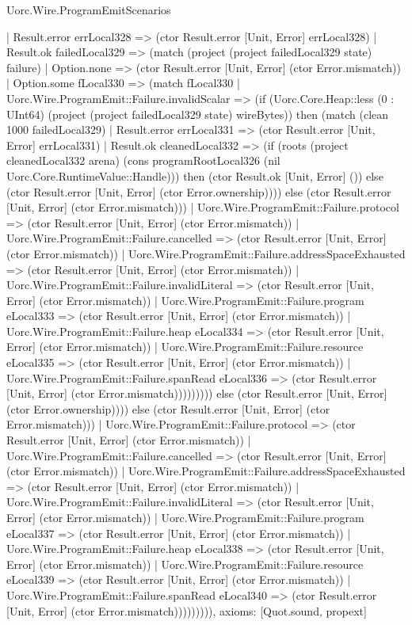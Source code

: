 \begin{lexlean}{Uorc.Wire.ProgramEmitScenarios}
\begin{semanticmodule}
{                | Result.error errLocal328 => (ctor Result.error [Unit, Error] errLocal328)
                | Result.ok failedLocal329 => (match (project (project failedLocal329 state) failure)
                  | Option.none => (ctor Result.error [Unit, Error] (ctor Error.mismatch))
                  | Option.some fLocal330 => (match fLocal330
                    | Uorc.Wire.ProgramEmit::Failure.invalidScalar => (if (Uorc.Core.Heap::less (0 : UInt64) (project (project failedLocal329 state) wireBytes)) then (match (clean 1000 failedLocal329)
                      | Result.error errLocal331 => (ctor Result.error [Unit, Error] errLocal331)
                      | Result.ok cleanedLocal332 => (if (roots (project cleanedLocal332 arena) (cons programRootLocal326 (nil Uorc.Core.RuntimeValue::Handle))) then (ctor Result.ok [Unit, Error] ()) else (ctor Result.error [Unit, Error] (ctor Error.ownership)))) else (ctor Result.error [Unit, Error] (ctor Error.mismatch)))
                    | Uorc.Wire.ProgramEmit::Failure.protocol => (ctor Result.error [Unit, Error] (ctor Error.mismatch))
                    | Uorc.Wire.ProgramEmit::Failure.cancelled => (ctor Result.error [Unit, Error] (ctor Error.mismatch))
                    | Uorc.Wire.ProgramEmit::Failure.addressSpaceExhausted => (ctor Result.error [Unit, Error] (ctor Error.mismatch))
                    | Uorc.Wire.ProgramEmit::Failure.invalidLiteral => (ctor Result.error [Unit, Error] (ctor Error.mismatch))
                    | Uorc.Wire.ProgramEmit::Failure.program eLocal333 => (ctor Result.error [Unit, Error] (ctor Error.mismatch))
                    | Uorc.Wire.ProgramEmit::Failure.heap eLocal334 => (ctor Result.error [Unit, Error] (ctor Error.mismatch))
                    | Uorc.Wire.ProgramEmit::Failure.resource eLocal335 => (ctor Result.error [Unit, Error] (ctor Error.mismatch))
                    | Uorc.Wire.ProgramEmit::Failure.spanRead eLocal336 => (ctor Result.error [Unit, Error] (ctor Error.mismatch))))))))) else (ctor Result.error [Unit, Error] (ctor Error.ownership)))) else (ctor Result.error [Unit, Error] (ctor Error.mismatch)))
          | Uorc.Wire.ProgramEmit::Failure.protocol => (ctor Result.error [Unit, Error] (ctor Error.mismatch))
          | Uorc.Wire.ProgramEmit::Failure.cancelled => (ctor Result.error [Unit, Error] (ctor Error.mismatch))
          | Uorc.Wire.ProgramEmit::Failure.addressSpaceExhausted => (ctor Result.error [Unit, Error] (ctor Error.mismatch))
          | Uorc.Wire.ProgramEmit::Failure.invalidLiteral => (ctor Result.error [Unit, Error] (ctor Error.mismatch))
          | Uorc.Wire.ProgramEmit::Failure.program eLocal337 => (ctor Result.error [Unit, Error] (ctor Error.mismatch))
          | Uorc.Wire.ProgramEmit::Failure.heap eLocal338 => (ctor Result.error [Unit, Error] (ctor Error.mismatch))
          | Uorc.Wire.ProgramEmit::Failure.resource eLocal339 => (ctor Result.error [Unit, Error] (ctor Error.mismatch))
          | Uorc.Wire.ProgramEmit::Failure.spanRead eLocal340 => (ctor Result.error [Unit, Error] (ctor Error.mismatch))))))))),
  axioms: [Quot.sound, propext]
}


\end{semanticmodule}
\end{lexlean}
